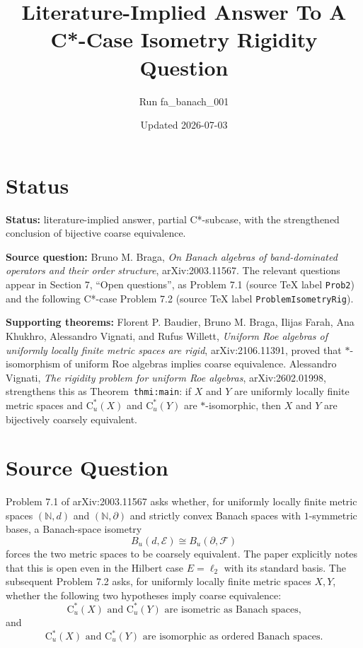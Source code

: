 \documentclass[11pt]{article}
\title{Literature-Implied Answer To A C*-Case Isometry Rigidity Question}
\author{Run fa\_banach\_001}
\date{Updated 2026-07-03}
\newcommand{\Cu}{\mathrm{C}^*_u}
\begin{document}
\maketitle

\section*{Status}

\textbf{Status:} literature-implied answer, partial C*-subcase, with the strengthened conclusion of bijective coarse equivalence.

\textbf{Source question:} Bruno M. Braga, \emph{On Banach algebras of band-dominated operators and their order structure}, arXiv:2003.11567.  The relevant questions appear in Section 7, ``Open questions'', as Problem 7.1 (source TeX label \texttt{Prob2}) and the following C*-case Problem 7.2 (source TeX label \texttt{ProblemIsometryRig}).

\textbf{Supporting theorems:} Florent P. Baudier, Bruno M. Braga, Ilijas Farah, Ana Khukhro, Alessandro Vignati, and Rufus Willett, \emph{Uniform Roe algebras of uniformly locally finite metric spaces are rigid}, arXiv:2106.11391, proved that $*$-isomorphism of uniform Roe algebras implies coarse equivalence.  Alessandro Vignati, \emph{The rigidity problem for uniform Roe algebras}, arXiv:2602.01998, strengthens this as Theorem~\texttt{thmi:main}: if $X$ and $Y$ are uniformly locally finite metric spaces and $\Cu(X)$ and $\Cu(Y)$ are $*$-isomorphic, then $X$ and $Y$ are bijectively coarsely equivalent.

\section*{Source Question}

Problem 7.1 of arXiv:2003.11567 asks whether, for uniformly locally finite metric spaces $(\mathbb N,d)$ and $(\mathbb N,\partial)$ and strictly convex Banach spaces with $1$-symmetric bases, a Banach-space isometry
\[
  B_u(d,\mathcal E) \cong B_u(\partial,\mathcal F)
\]
forces the two metric spaces to be coarsely equivalent.  The paper explicitly notes that this is open even in the Hilbert case $E=\ell_2$ with its standard basis.  The subsequent Problem 7.2 asks, for uniformly locally finite metric spaces $X,Y$, whether the following two hypotheses imply coarse equivalence:
\[
  \Cu(X) \text{ and } \Cu(Y) \text{ are isometric as Banach spaces,}
\]
and
\[
  \Cu(X) \text{ and } \Cu(Y) \text{ are isomorphic as ordered Banach spaces.}
\]
\end{document}
